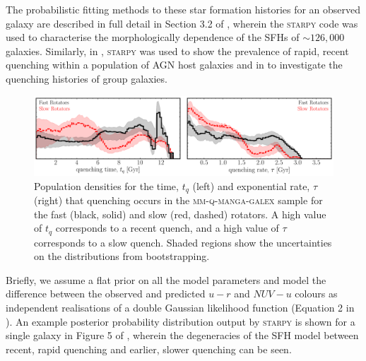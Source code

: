\documentclass[useAMS,usenatbib]{mn2e}
\begin{document}
The probabilistic fitting methods to these star formation histories for an observed galaxy are described in full detail in Section 3.2 of \cite{smethurst15}, wherein the \textsc{starpy} code was used to characterise the morphologically dependence of the SFHs of $\sim126,000$ galaxies. Similarly, in \cite{smethurst16}, \textsc{starpy} was used to show the prevalence of rapid, recent quenching within a population of AGN host galaxies and in \cite{smethurst17} to investigate the quenching histories of group galaxies.  

\begin{figure}
\centering
\includegraphics[width=\textwidth]{../figures/quenching_time_rate_FR_SR_nonkdc_MM_NSF_1sigma_C16.pdf}
\caption{Population densities for the time, $t_q$ (left) and exponential rate, $\tau$ (right) that quenching occurs in the \textsc{mm-q-manga-galex} sample for the fast (black, solid) and slow (red, dashed) rotators. A high value of $t_q$ corresponds to a recent quench, and a high value of $\tau$ corresponds to a slow quench. Shaded regions show the uncertainties on the distributions from bootstrapping. %
}
\label{fig:popfrvsr}
\end{figure}

Briefly, we assume a flat prior on all the model parameters and model the difference between the observed and predicted $u-r$ and $NUV-u$ colours as independent realisations of a double Gaussian likelihood function (Equation 2 in \citealt{smethurst15}). An example posterior probability distribution output by \textsc{starpy} is shown for a single galaxy in Figure 5 of \cite{smethurst15}, wherein the degeneracies of the SFH model between recent, rapid quenching and earlier, slower quenching can be seen.
\end{document}
